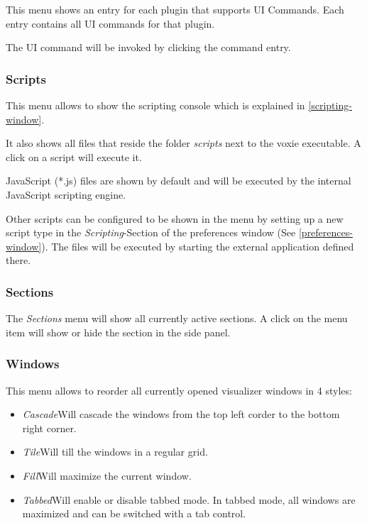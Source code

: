 This menu shows an entry for each plugin that supports UI Commands.
Each entry contains all UI commands for that plugin.

The UI command will be invoked by clicking the command entry.

\subsubsection{Scripts}

This menu allows to show the scripting console which is explained in \ref{scripting-window}.

It also shows all files that reside the folder \emph{scripts} next
to the voxie executable. A click on a script will execute it.

JavaScript (*.js) files are shown by default and will be executed by the
internal JavaScript scripting engine.

Other scripts can be configured to be shown in the menu by setting up a new
script type in the \emph{Scripting}-Section of the preferences window (See \ref{preferences-window}). The files will be executed by starting the external
application defined there.

\subsubsection{Sections}

The \emph{Sections} menu will show all currently active sections.
A click on the menu item will show or hide the section in the side panel.

\subsubsection{Windows}

This menu allows to reorder all currently opened visualizer windows in 4 styles:
\begin{itemize}
  \item{\emph{Cascade}\newline Will cascade the windows from the top left
    corder to the bottom right corner.}
  \item{\emph{Tile}\newline Will till the windows in a regular grid.}
  \item{\emph{Fill}\newline Will maximize the current window.}
  \item{\emph{Tabbed}\newline Will enable or disable tabbed mode. In tabbed mode,
    all windows are maximized and can be switched with a tab control.}
\end{itemize}

